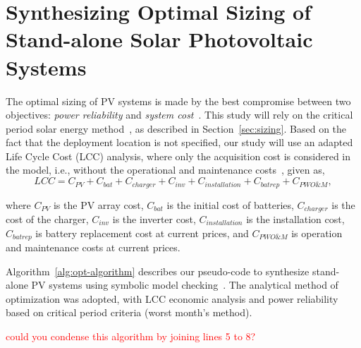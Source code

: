 \documentclass[runningheads]{llncs}
\begin{document}
\section{Synthesizing Optimal Sizing of Stand-alone Solar Photovoltaic Systems}

The optimal sizing of PV systems is made by the best compromise between two objectives: \textit{power reliability} and \textit{system cost}~\cite{Alsadi2018}. This study will rely on the critical period solar energy method~\cite{Pinho}, as described in Section~\ref{sec:sizing}. Based on the fact that the deployment location is not specified, our study will use an adapted Life Cycle Cost (LCC) analysis, where only the acquisition cost is considered in the model, i.e., without the operational and maintenance costs~\cite{Alsadi2018}, given as,
%
\begin{equation}
\label{eq:LCC}
LCC = C_{PV} + C_{bat} + C_{charger} + C_{inv} + C_{installation} + C_{batrep} + C_{PWO\&M},
\end{equation}

\noindent where $C_{PV}$ is the PV array cost, $C_{bat}$ is the initial cost of batteries, $C_{charger}$ is the cost of the charger, $C_{inv}$ is the inverter cost, $C_{installation}$ is the installation cost, $C_{batrep}$ is battery replacement cost at current prices, and $C_{PWO\&M}$ is operation and maintenance costs at current prices.

Algorithm~\ref{alg:opt-algorithm} describes our pseudo-code to synthesize stand-alone PV systems using symbolic model checking~\cite{DBLP:journals/corr/abs-1909-13139}. The analytical method of optimization was adopted, with LCC economic analysis and power reliability based on critical period criteria (worst month's method).

\textcolor{red}{could you condense this algorithm by joining lines 5 to 8?}
\end{document}
